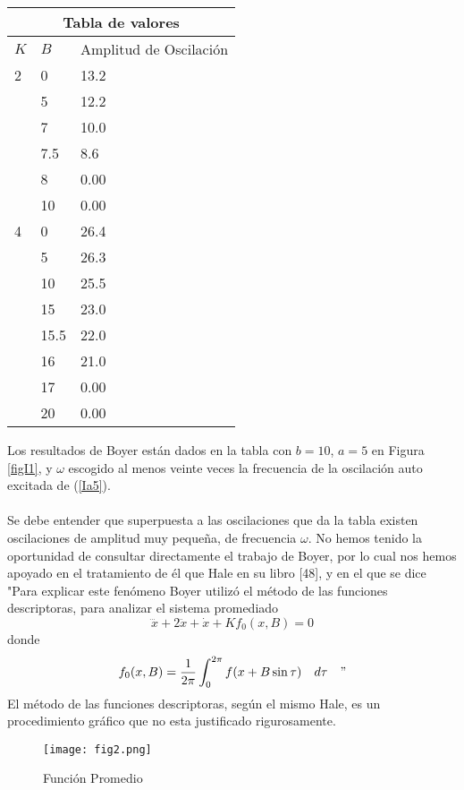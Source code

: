 \documentclass[letter]{article}
\begin{document}
\begin{center}
\begin{tabular}{l|l|l}\hline
\multicolumn{3}{c}{Tabla de valores}\\\hline $K$&$B$&Amplitud de
Oscilaci{\'o}n
\\\hline
2&0&13.2\\
&5&12.2\\
&7&10.0\\
&7.5&8.6\\
&8&0.00\\
&10&0.00\\
4&0&26.4\\
& 5& 26.3\\
&10&25.5\\
&15& 23.0\\
&15.5& 22.0\\
& 16 & 21.0\\
& 17 & 0.00\\
& 20& 0.00
\end{tabular}
\end{center}
Los resultados de Boyer est{\'a}n dados en la tabla con $b=10$, $a=5$
en Figura \ref{figI1}, y $\omega$ escogido al menos veinte veces
la frecuencia de la oscilaci{\'o}n auto excitada de (\ref{Ia5}).
\\
\\
Se debe entender que superpuesta a las oscilaciones que da la
tabla \-existen oscilaciones de amplitud muy peque{\~n}a, de
frecuencia $\omega$. No hemos tenido la oportunidad de consultar
directamente el trabajo de Boyer, por lo cual nos hemos apoyado en
el tratamiento de {\'e}l que Hale en su libro [48], y en el que se
dice "Para explicar este fen{\'o}meno Boyer utiliz{\'o} el m{\'e}todo de las
funciones descriptoras, para analizar el sistema promediado
\begin{equation}\label{Simo81}
\dddot{x}+2\ddot{x}+\dot{x}+Kf_0(x,B)=0
\end{equation}
donde
\begin{equation}\label{Simo7}
f_0(x,B)=\displaystyle{\frac{1}{2\pi}}\int_0^{2\pi}
f(x+B\sin\tau)\quad d\tau\quad"
\end{equation}
El m{\'e}todo de las funciones descriptoras, seg{\'u}n el mismo Hale, es
un procedimiento gr{\'a}fico que no esta justificado rigurosamente.
\begin{figure}[h]
\centering
\texttt{[image: fig2.png]}
\caption{Funci{\'o}n Promedio} \label{figura2}
\end{figure}
\\
\end{document}
